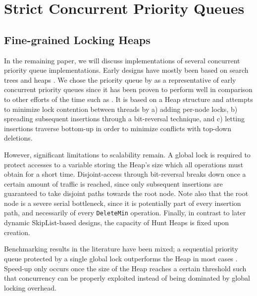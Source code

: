 \chapter{Strict Concurrent Priority Queues} \label{ch:strict}

\section{Fine-grained Locking Heaps} \label{sec:hunt}

In the remaining paper, we will discuss implementations of several concurrent priority queue implementations.
Early designs have mostly been based on search trees \cite{boyar1994chromatic,johnson1991highly} and
heaps \cite{ayani1990lr,biswas1987simultaneous,das1996distributed,deo1992parallel,huang1991evaluation,
luchetti1993some,mans1998portable,olariu1991optimal,prasad1995parallel}.
We chose the priority queue by \citeauthor{hunt1996efficient} \cite{hunt1996efficient}
as a representative of early concurrent priority queues since it has been proven to
perform well \cite{shavit2000skiplist} in comparison to other efforts of the time such as \cite{nageshwara1988concurrent,ayani1990lr,yan1998lock}. %
It is based on a Heap
structure and attempts to minimize lock contention between threads by a) adding per-node
locks, b) spreading subsequent insertions through a bit-reversal technique, %
and c) letting insertions traverse bottom-up in order to minimize conflicts with
top-down deletions.

However, significant limitations to scalability remain. A global lock is required
to protect accesses to a variable storing the Heap's size which all operations
must obtain for a short time. Disjoint-access through bit-reversal breaks down
once a certain amount of traffic is reached, since only subsequent insertions
are guaranteed to take disjoint paths towards the root node. Note also that
the root node is a severe serial bottleneck, since it is potentially part of
every insertion path, and necessarily of every \lstinline|DeleteMin| operation.
Finally, in contrast to later dynamic SkipList-based designs, the capacity of Hunt Heaps
is fixed upon creation.

Benchmarking results in the literature have been mixed; a sequential priority
queue protected by a single global lock outperforms the \citeauthor{hunt1996efficient}
Heap in most cases \cite{hunt1996efficient,sundell2003fast}. Speed-up only occurs once
the size of the Heap reaches a certain threshold such that concurrency
can be properly exploited instead of being dominated by global locking overhead.

